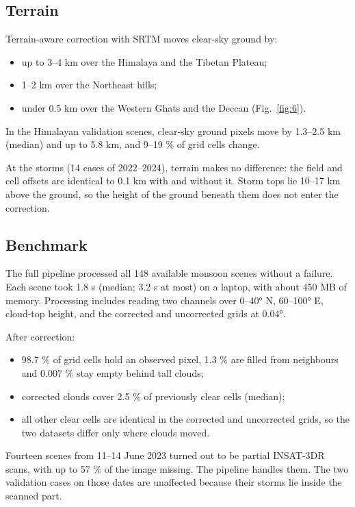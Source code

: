 \subsection{Terrain}\label{sec:5.7}

Terrain-aware correction with SRTM moves clear-sky ground by:

\begin{itemize}
\tightlist
\item
  up to 3--4 km over the Himalaya and the Tibetan Plateau;
\item
  1--2 km over the Northeast hills;
\item
  under 0.5 km over the Western Ghats and the Deccan (Fig.~\ref{fig:6}).
\end{itemize}

In the Himalayan validation scenes, clear-sky ground pixels move by 1.3--2.5 km (median) and up to 5.8 km, and 9--19 \% of grid cells change.

At the storms (14 cases of 2022--2024), terrain makes no difference: the field and cell offsets are identical to 0.1 km with and without it. Storm tops lie 10--17 km above the ground, so the height of the ground beneath them does not enter the correction.

\subsection{Benchmark}\label{sec:5.8}

The full pipeline processed all 148 available monsoon scenes without a failure. Each scene took 1.8 s (median; 3.2 s at most) on a laptop, with about 450 MB of memory. Processing includes reading two channels over 0--40° N, 60--100° E, cloud-top height, and the corrected and uncorrected grids at 0.04°.

After correction:

\begin{itemize}
\tightlist
\item
  98.7 \% of grid cells hold an observed pixel, 1.3 \% are filled from neighbours and 0.007 \% stay empty behind tall clouds;
\item
  corrected clouds cover 2.5 \% of previously clear cells (median);
\item
  all other clear cells are identical in the corrected and uncorrected grids, so the two datasets differ only where clouds moved.
\end{itemize}

Fourteen scenes from 11--14 June 2023 turned out to be partial INSAT-3DR scans, with up to 57 \% of the image missing. The pipeline handles them. The two validation cases on those dates are unaffected because their storms lie inside the scanned part.

